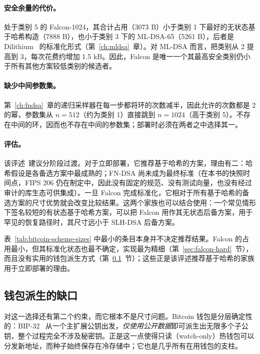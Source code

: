 \paragraph{安全余量的代价。}
处于类别 5 的 Falcon-1024，其合计占用（3073 B）小于类别 1 下最好的无状态基于哈希构造（7888 B），也小于类别 3 下的 ML-DSA-65（5261 B），后者是 Dilithium~\cite{dilithium2018} 的标准化形式（第~\ref{ch:mldsa}~章）。对 ML-DSA 而言，把类别从 2 提高到 3，每次花费约增加 1.5 kB。因此，Falcon 是唯一一个其最高安全类别仍小于所有其他方案较低类别的候选者。

\paragraph{缺少中间参数集。}
第~\ref{ch:fndsa}~章的递归采样器在每一步都将环的次数减半，因此允许的次数都是 2 的幂，参数集从 $n=512$（约为类别 1）直接跳到 $n=1024$（高于类别 5）。不存在中间的环，因而也不存在中间的参数集；部署时必须在两者之中选择其一。

\paragraph{评估。}
该评述~\cite{blockstreamlattice2026}建议分阶段过渡。对于立即部署，它推荐基于哈希的方案，理由有二：哈希假设是各备选方案中最成熟的；FN-DSA 尚未成为最终标准（在本书的快照时间点，FIPS 206 仍在制定中，因此没有固定的规范、没有测试向量，也没有经过审计的库生态可供集成）。一旦 Falcon 完成标准化，它相对于所有基于哈希的备选方案的尺寸优势就会改变比较结果。这两个家族也可以结合使用：一个常见情形下签名较短的有状态基于哈希方案，可以把 Falcon 用作其无状态后备方案，用于罕见的恢复路径时，其尺寸远小于 SLH-DSA 后备方案。

\begin{remark}[仅凭尺寸并不能决定选择]
表~\ref{tab:bitcoin-scheme-sizes} 中最小的条目本身并不决定推荐结果。Falcon 的占用最小，但其标准化状态也最不确定，实现最为精细（第~\ref{sec:falcon-hard}~节），而且没有实用的钱包派生方式（第~\ref{sec:pq-wallet-derivation}~节）；这些正是该评述推荐基于哈希的家族用于立即部署的理由。
\end{remark}

\subsection{钱包派生的缺口}
\label{sec:pq-wallet-derivation}

对这一选择还有第二个约束，而它根本不是尺寸问题。Bitcoin 钱包是分层确定性的：BIP-32~\cite{bip32} 从一个主扩展公钥出发，\emph{仅使用公开数据}即可派生出无限多个子公钥，整个过程完全不涉及秘密钥。正是这一点使得只读（watch-only）热钱包可以分发新地址，而种子始终保存在冷存储中；它也是几乎所有在用钱包的支柱。

